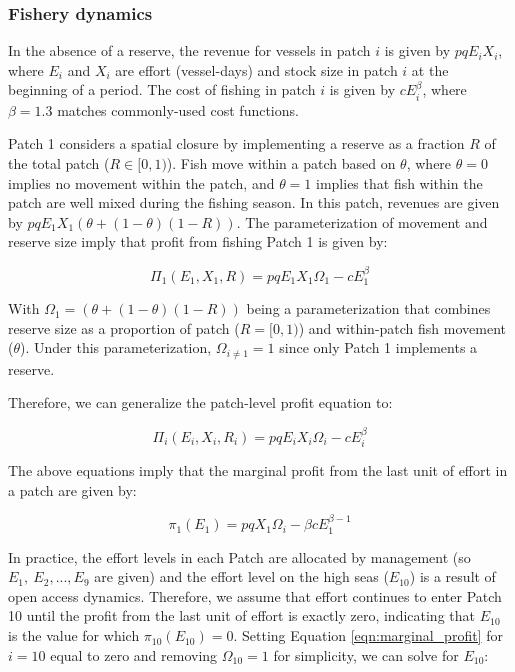 \documentclass[12pt]{article}
\begin{document}
\subsubsection{Fishery dynamics}

In the absence of a reserve, the revenue for vessels in patch $i$ is given by $pqE_iX_i$, where $E_i$ and $X_i$ are effort (vessel-days) and stock size in patch $i$ at the beginning of a period. The cost of fishing in patch $i$ is given by $cE_i^\beta$, where $\beta = 1.3$ matches commonly-used cost functions.

Patch 1 considers a spatial closure by implementing a reserve as a fraction $R$ of the total patch ($R \in[0,1)$). Fish move within a patch based on $\theta$, where $\theta = 0$ implies no movement within the patch, and $\theta = 1$ implies that fish within the patch are well mixed during the fishing season. In this patch, revenues are given by $pqE_1X_1(\theta + (1 - \theta)(1 - R))$. The parameterization of movement and reserve size imply that profit from fishing Patch 1 is given by:

$$
\Pi_1(E_1,X_1,R) = pqE_1X_1\Omega_1-cE_1^\beta
$$

With $\Omega_1 = (\theta + (1 - \theta)(1 - R))$ being a parameterization that combines reserve size as a proportion of patch ($R =  [0, 1)$) and within-patch fish movement ($\theta$). Under this parameterization, $\Omega_{i \neq 1} = 1$ since only Patch 1 implements a reserve.

Therefore, we can generalize the patch-level profit equation to:

$$
\Pi_i(E_i,X_i, R_i) = pqE_iX_i\Omega_i-cE_i^\beta
$$

The above equations imply that the marginal profit from the last unit of effort in a patch are given by:

\begin{equation}
\pi_1(E_1) = pqX_1\Omega_i - \beta cE_1^{\beta-1}
\label{eqn:marginal_profit}
\end{equation}

In practice, the effort levels in each Patch are allocated by management (so $E_{1},\ E_{2},...,E_{9}$ are given) and the
effort level on the high seas ($E_{10}$) is a result of open access dynamics. Therefore, we assume that effort continues to enter Patch 10 until the profit from the last unit of effort is exactly zero, indicating that $E_{10}$ is the value for which $\pi_{10}(E_{10})  = 0$. Setting Equation \ref{eqn:marginal_profit} for $i = 10$ equal to zero and removing $\Omega_{10} = 1$ for simplicity, we can solve for $E_{10}$:
\end{document}
